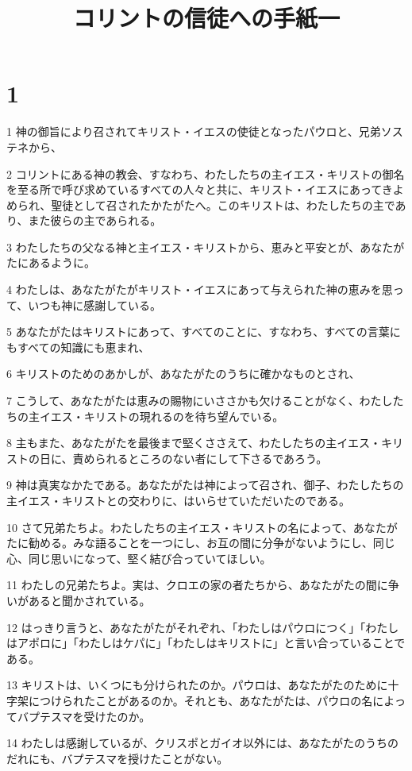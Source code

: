 

\title{コリントの信徒への手紙一}


\chapter{1}

\par 1 神の御旨により召されてキリスト・イエスの使徒となったパウロと、兄弟ソステネから、
\par 2 コリントにある神の教会、すなわち、わたしたちの主イエス・キリストの御名を至る所で呼び求めているすべての人々と共に、キリスト・イエスにあってきよめられ、聖徒として召されたかたがたへ。このキリストは、わたしたちの主であり、また彼らの主であられる。
\par 3 わたしたちの父なる神と主イエス・キリストから、恵みと平安とが、あなたがたにあるように。
\par 4 わたしは、あなたがたがキリスト・イエスにあって与えられた神の恵みを思って、いつも神に感謝している。
\par 5 あなたがたはキリストにあって、すべてのことに、すなわち、すべての言葉にもすべての知識にも恵まれ、
\par 6 キリストのためのあかしが、あなたがたのうちに確かなものとされ、
\par 7 こうして、あなたがたは恵みの賜物にいささかも欠けることがなく、わたしたちの主イエス・キリストの現れるのを待ち望んでいる。
\par 8 主もまた、あなたがたを最後まで堅くささえて、わたしたちの主イエス・キリストの日に、責められるところのない者にして下さるであろう。
\par 9 神は真実なかたである。あなたがたは神によって召され、御子、わたしたちの主イエス・キリストとの交わりに、はいらせていただいたのである。
\par 10 さて兄弟たちよ。わたしたちの主イエス・キリストの名によって、あなたがたに勧める。みな語ることを一つにし、お互の間に分争がないようにし、同じ心、同じ思いになって、堅く結び合っていてほしい。
\par 11 わたしの兄弟たちよ。実は、クロエの家の者たちから、あなたがたの間に争いがあると聞かされている。
\par 12 はっきり言うと、あなたがたがそれぞれ、「わたしはパウロにつく」「わたしはアポロに」「わたしはケパに」「わたしはキリストに」と言い合っていることである。
\par 13 キリストは、いくつにも分けられたのか。パウロは、あなたがたのために十字架につけられたことがあるのか。それとも、あなたがたは、パウロの名によってバプテスマを受けたのか。
\par 14 わたしは感謝しているが、クリスポとガイオ以外には、あなたがたのうちのだれにも、バプテスマを授けたことがない。
